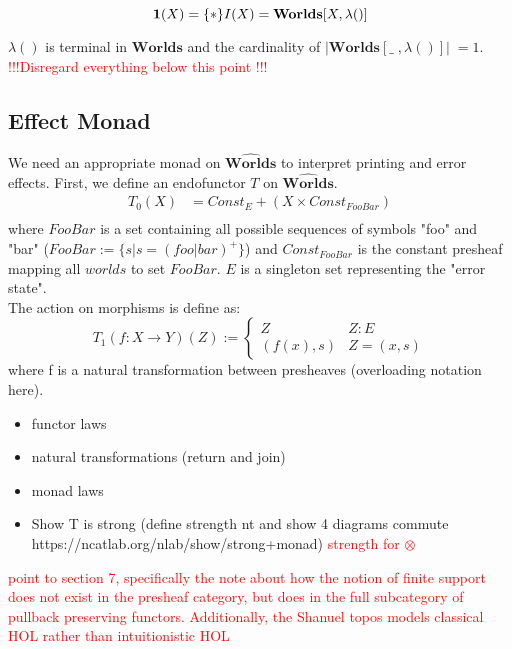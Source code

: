 \documentclass{article}
\newcommand{\red}[1]{\textcolor{red}{#1}}
\newcommand{\worlds}{\widehat{\mathbf{Worlds}}}
\begin{document}
\[ 
    \mathbf{1}(X) = \{*\} \\
    I(X) = \mathbf{Worlds}[X , \lambda()]
\]

$\lambda()$ is terminal in $\mathbf{Worlds}$ and the cardinality of $|\mathbf{Worlds}[\_\;,\lambda()]| \;= 1$.
\\
\red{!!!Disregard everything below this point !!!}

\subsection{Effect Monad}

We need an appropriate monad on $\worlds$ to interpret printing and error effects. First, we define an endofunctor $T$ on $\worlds$.
\begin{align*}
    T_0(X) &= Const_E + (X \times Const_{FooBar})\\
\end{align*}
where $FooBar$ is a set containing all possible sequences of symbols "foo" and "bar" ($FooBar := \{s | s = (foo | bar)^+\}$) and $Const_{FooBar}$ is the constant presheaf mapping all $worlds$ to set $FooBar$. $E$ is a singleton set representing the "error state".
\\
The action on morphisms is define as: 
\[ 
T_1(f: X \rightarrow Y)(Z) :=\begin{cases} 
      Z & Z: E \\
      (f(x), s) & Z = (x,s)
      \end{cases}
\]
where f is a natural transformation between presheaves (overloading notation here).
\begin{itemize}
    \item functor laws
    \item natural transformations (return and join)
    \item monad laws
    \item Show T is strong (define strength nt and show 4 diagrams commute https://ncatlab.org/nlab/show/strong+monad) \red{strength for $\otimes$}
\end{itemize}
\red{\cite{gabbayNewApproachAbstract2002} point to section 7, specifically 
the note about how the notion of finite support does not exist in the presheaf category, but does in the
full subcategory of pullback preserving functors. Additionally, the Shanuel topos models 
classical HOL rather than intuitionistic HOL}
\end{document}
